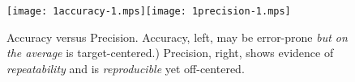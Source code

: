 




\begin{figure}
\begin{center}
	\vspace{3mm}
		\texttt{[image: 1accuracy-1.mps]}\hspace{5mm}\texttt{[image: 1precision-1.mps]}
\end{center}
	\caption{Accuracy versus Precision. Accuracy, left, may be error-prone \textit{but on the average} is target-centered.) Precision, right, shows evidence of \textit{repeatability} and is \textit{reproducible} yet off-centered.}
\end{figure}

